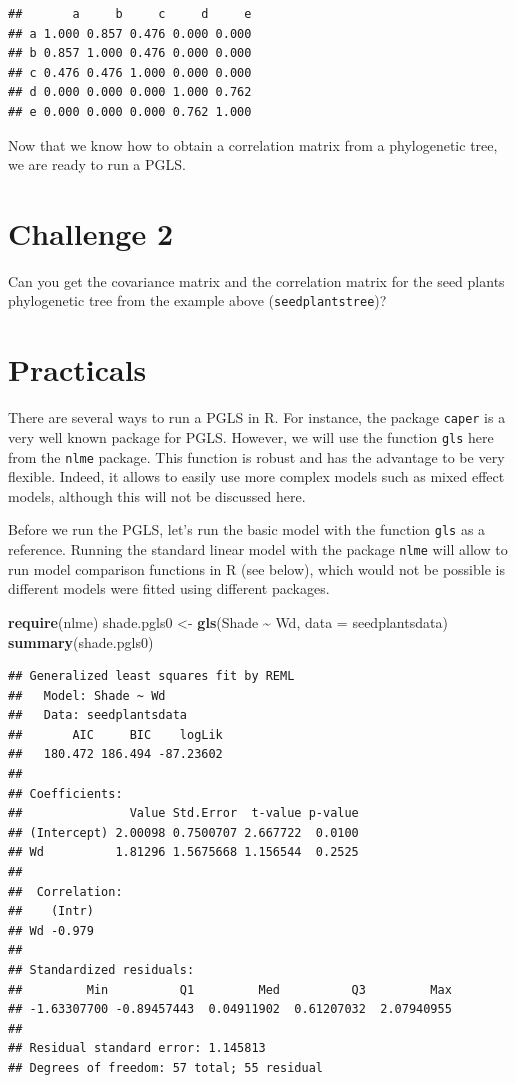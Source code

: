 \documentclass[
]{book}
\newenvironment{Shaded}{\begin{snugshade}}{\end{snugshade}}
\newcommand{\AttributeTok}[1]{\textcolor[rgb]{0.13,0.29,0.53}{#1}}
\newcommand{\FunctionTok}[1]{\textcolor[rgb]{0.13,0.29,0.53}{\textbf{#1}}}
\newcommand{\NormalTok}[1]{#1}
\newcommand{\OtherTok}[1]{\textcolor[rgb]{0.56,0.35,0.01}{#1}}
\newcommand{\SpecialCharTok}[1]{\textcolor[rgb]{0.81,0.36,0.00}{\textbf{#1}}}
\begin{document}
\begin{verbatim}
##       a     b     c     d     e
## a 1.000 0.857 0.476 0.000 0.000
## b 0.857 1.000 0.476 0.000 0.000
## c 0.476 0.476 1.000 0.000 0.000
## d 0.000 0.000 0.000 1.000 0.762
## e 0.000 0.000 0.000 0.762 1.000
\end{verbatim}

Now that we know how to obtain a correlation matrix from a phylogenetic tree, we are ready to run a PGLS.

\section{Challenge 2}\label{challenge-2}

Can you get the covariance matrix and the correlation matrix for the seed plants phylogenetic tree from the example above (\texttt{seedplantstree})?

\section{Practicals}\label{practicals}

There are several ways to run a PGLS in R. For instance, the package \texttt{caper} is a very well known package for PGLS. However, we will use the function \texttt{gls} here from the \texttt{nlme} package. This function is robust and has the advantage to be very flexible. Indeed, it allows to easily use more complex models such as mixed effect models, although this will not be discussed here.

Before we run the PGLS, let's run the basic model with the function \texttt{gls} as a reference. Running the standard linear model with the package \texttt{nlme} will allow to run model comparison functions in R (see below), which would not be possible is different models were fitted using different packages.

\begin{Shaded}
\begin{Highlighting}[]
\FunctionTok{require}\NormalTok{(nlme)}
\NormalTok{shade.pgls0 }\OtherTok{\textless{}{-}} \FunctionTok{gls}\NormalTok{(Shade }\SpecialCharTok{\textasciitilde{}}\NormalTok{ Wd, }\AttributeTok{data =}\NormalTok{ seedplantsdata)}
\FunctionTok{summary}\NormalTok{(shade.pgls0)}
\end{Highlighting}
\end{Shaded}

\begin{verbatim}
## Generalized least squares fit by REML
##   Model: Shade ~ Wd 
##   Data: seedplantsdata 
##       AIC     BIC    logLik
##   180.472 186.494 -87.23602
## 
## Coefficients:
##               Value Std.Error  t-value p-value
## (Intercept) 2.00098 0.7500707 2.667722  0.0100
## Wd          1.81296 1.5675668 1.156544  0.2525
## 
##  Correlation: 
##    (Intr)
## Wd -0.979
## 
## Standardized residuals:
##         Min          Q1         Med          Q3         Max 
## -1.63307700 -0.89457443  0.04911902  0.61207032  2.07940955 
## 
## Residual standard error: 1.145813 
## Degrees of freedom: 57 total; 55 residual
\end{verbatim}
\end{document}
